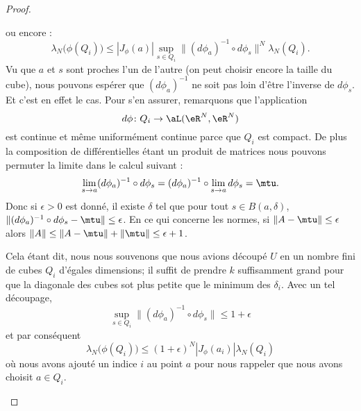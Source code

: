 \begin{proof}
\begin{enumerate}
\begin{subproof}
                ou encore :
                \begin{equation}
                    \lambda_N\big( \phi(Q_i) \big)\leq | J_{\phi}(a) |\sup_{s\in Q_i}\| (d\phi_a)^{-1}\circ d\phi_s \|^N\lambda_N(Q_i).
                \end{equation}
                Vu que \( a\) et \( s\) sont proches l'un de l'autre (on peut choisir encore la taille du cube), nous pouvons espérer que \( (d\phi_a)^{-1}\) ne soit pas loin d'être l'inverse de \( d\phi_s\). Et c'est en effet le cas. Pour s'en assurer, remarquons que l'application
                \begin{equation}
                    d\phi\colon Q_i\to \aL(\eR^N,\eR^N)
                \end{equation}
                est continue et même uniformément continue parce que \( Q_i\) est compact. De plus la composition de différentielles étant un produit de matrices nous pouvons permuter la limite dans le calcul suivant :
                \begin{equation}
                    \lim_{s\to a}(d\phi_a)^{-1}\circ d\phi_s=(d\phi_a)^{-1}\circ\lim_{s\to a}d\phi_s=\mtu.
                \end{equation}
                Donc si \( \epsilon>0\) est donné, il existe \( \delta\) tel que pour tout \( s\in B(a,\delta)\), \( \| (d\phi_a)^{-1}\circ d\phi_s-\mtu \|\leq \epsilon\). En ce qui concerne les  normes, si \( \| A-\mtu \|\leq \epsilon\) alors \( \| A \|\leq \| A-\mtu \|+\| \mtu \|\leq \epsilon+1\).

                Cela étant dit, nous nous souvenons que nous avions découpé \( U\) en un nombre fini de cubes \( Q_i\) d'égales dimensions; il suffit de prendre \( k\) suffisamment grand pour que la diagonale des cubes sot plus petite que le minimum des \( \delta_i\). Avec un tel découpage,
                \begin{equation}
                    \sup_{s\in Q_i}\| (d\phi_a)^{-1}\circ d\phi_s \|\leq 1+\epsilon
                \end{equation}
                et par conséquent
                \begin{equation}        \label{EqooQRMNooZduAkX}
                    \lambda_N\big( \phi(Q_i) \big)\leq (1+\epsilon)^N| J_{\phi}(a_i) |\lambda_N(Q_i)
                \end{equation}
                où nous avons ajouté un indice \( i\) au point \( a\) pour nous rappeler que nous avons choisit \( a\in Q_i\). 


\end{subproof}
\end{enumerate}
\end{proof}
